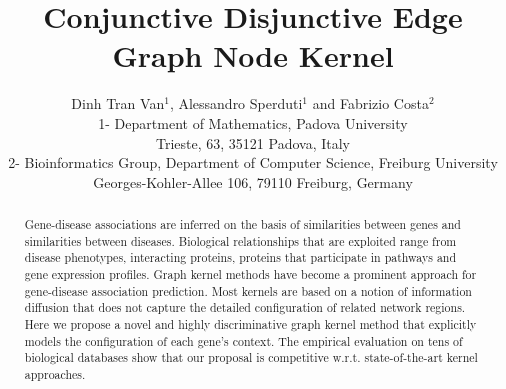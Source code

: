\documentclass{esannV2}
\begin{document}
\title{Conjunctive Disjunctive Edge \\Graph Node Kernel}

\author{Dinh Tran Van$^1$, Alessandro Sperduti$^1$ and Fabrizio Costa$^2$
%
%
\vspace{.3cm}\\
%
1- Department of Mathematics, Padova University\\
Trieste, 63, 35121 Padova, Italy
%
\vspace{.1cm}\\
2- Bioinformatics Group, Department of Computer Science, Freiburg University \\
Georges-Kohler-Allee 106, 79110 Freiburg, Germany\\
}

\maketitle

\begin{abstract}\noindent 
Gene-disease associations are inferred on the basis of similarities between genes and similarities between diseases. Biological relationships that are exploited range from disease phenotypes, interacting proteins, proteins that participate in pathways and gene expression profiles. Graph kernel methods have become a prominent approach for gene-disease association prediction. Most kernels are based on a notion of information diffusion that does not capture the detailed configuration of related network regions. Here we propose a novel and highly discriminative graph kernel method that explicitly models the configuration of each gene's context. The empirical evaluation on tens of biological databases show that our proposal is competitive w.r.t. state-of-the-art kernel approaches.
\end{abstract}
\end{document}
